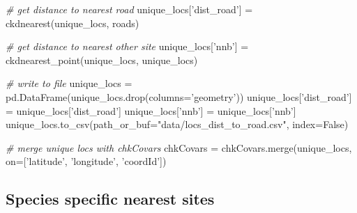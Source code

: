\documentclass[]{article}
\newenvironment{Shaded}{}{}
\newcommand{\CommentTok}[1]{\textcolor[rgb]{0.38,0.63,0.69}{\textit{#1}}}
\newcommand{\KeywordTok}[1]{\textcolor[rgb]{0.00,0.44,0.13}{\textbf{#1}}}
\newcommand{\NormalTok}[1]{#1}
\newcommand{\OperatorTok}[1]{\textcolor[rgb]{0.40,0.40,0.40}{#1}}
\newcommand{\StringTok}[1]{\textcolor[rgb]{0.25,0.44,0.63}{#1}}
\newcommand{\VariableTok}[1]{\textcolor[rgb]{0.10,0.09,0.49}{#1}}
\begin{document}
\begin{Shaded}
\begin{Highlighting}[]
\CommentTok{# get distance to nearest road}
\NormalTok{unique_locs[}\StringTok{'dist_road'}\NormalTok{] }\OperatorTok{=}\NormalTok{ ckdnearest(unique_locs, roads)}

\CommentTok{# get distance to nearest other site}
\NormalTok{unique_locs[}\StringTok{'nnb'}\NormalTok{] }\OperatorTok{=}\NormalTok{ ckdnearest_point(unique_locs, unique_locs)}

\CommentTok{# write to file}
\NormalTok{unique_locs }\OperatorTok{=}\NormalTok{ pd.DataFrame(unique_locs.drop(columns}\OperatorTok{=}\StringTok{'geometry'}\NormalTok{))}
\NormalTok{unique_locs[}\StringTok{'dist_road'}\NormalTok{] }\OperatorTok{=}\NormalTok{ unique_locs[}\StringTok{'dist_road'}\NormalTok{]}
\NormalTok{unique_locs[}\StringTok{'nnb'}\NormalTok{] }\OperatorTok{=}\NormalTok{ unique_locs[}\StringTok{'nnb'}\NormalTok{]}
\NormalTok{unique_locs.to_csv(path_or_buf}\OperatorTok{=}\StringTok{"data/locs_dist_to_road.csv"}\NormalTok{, index}\OperatorTok{=}\VariableTok{False}\NormalTok{)}

\CommentTok{# merge unique locs with chkCovars}
\NormalTok{chkCovars }\OperatorTok{=}\NormalTok{ chkCovars.merge(unique_locs, on}\OperatorTok{=}\NormalTok{[}\StringTok{'latitude'}\NormalTok{, }\StringTok{'longitude'}\NormalTok{, }\StringTok{'coordId'}\NormalTok{])}
\end{Highlighting}
\end{Shaded}

\hypertarget{species-specific-nearest-sites}{%
\subsection{Species specific nearest sites}\label{species-specific-nearest-sites}}

\begin{Shaded}
\end{Shaded}
\end{document}
